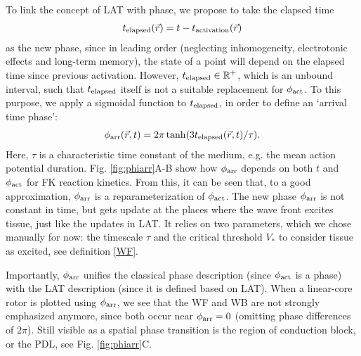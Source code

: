 \documentclass[aps,pre,amsfonts,amssymb,amsmath,twocolumn, superscriptaddress]{revtex4-1}
\newcommand{\phiact}{\ensuremath{\phi_{\rm act}}}
\newcommand{\phiarr}{\ensuremath{\phi_{\rm arr}}}
\newcommand{\tlap}{\ensuremath{t_{\rm elapsed}}}
\newcommand{\tact}{\ensuremath{t_{\rm activation}}}
\newcommand{\VS}{V_*}
\begin{document}
To link the concept of LAT with phase, we propose to take the elapsed time
\begin{align}
\tlap(\vec{r}) = t - \tact(\vec{r})
\end{align}
as the new phase, since in leading order (neglecting inhomogeneity, electrotonic effects and long-term memory), the state of a point will depend on the elapsed time since previous activation. However, $\tlap \in \mathbb{R}^+$, which is an unbound interval, such that $\tlap$ itself is not a suitable replacement for $\phiact$. To this purpose, we apply a sigmoidal function to $\tlap$, in order to define an `arrival time phase': 
\begin{align}
\phiarr(\vec{r},t) = 2 \pi \tanh (3 \tlap(\vec{r},t) / \tau). \label{phiarr}
\end{align}
Here, $\tau$ is a characteristic time constant of the medium, e.g. the mean action potential duration. Fig. \ref{fig:phiarr}A-B show how $\phiarr$ depends on both $t$ and $\phiact$ for FK reaction kinetics. From this, it can be seen that, to a good approximation, $\phiarr$ is a reparameterization of $\phiact$. The new phase $\phiarr$ is not constant in time, but gets update at the places where the wave front excites tissue, just like the updates in LAT. It relies on two parameters, which we chose manually for now: the timescale $\tau$ and the critical threshold $\VS$ to consider tissue as excited, see definition \eqref{WF}. 

Importantly, $\phiarr$ unifies the classical phase description (since $\phiact$ is a phase) with the LAT description (since it is defined based on LAT). When a linear-core rotor is plotted using $\phiarr$, we see that the WF and WB are not strongly emphasized anymore, since both occur near $\phiarr= 0$ (omitting phase differences of $2\pi$). Still visible as a spatial phase transition is the region of conduction block, or the PDL, see Fig. \ref{fig:phiarr}C. 
\end{document}
